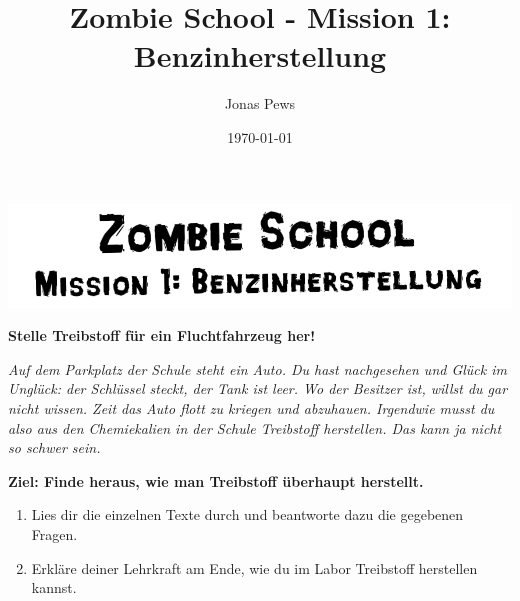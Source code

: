 \documentclass{scrartcl}  %
\author{Jonas Pews}
\title{Zombie School - Mission 1: Benzinherstellung}
\date{\today}
\begin{document}
	\begin{center}
		\includegraphics{img/headline_ch_01_raffinerie}
	\end{center}	
	
	\begin{center}
		{\LARGE \textbf{Stelle Treibstoff für ein Fluchtfahrzeug her!}}
	\end{center}
	
\vspace{0.7cm}	
	\textit{Auf dem Parkplatz der Schule steht ein Auto. Du hast nachgesehen und Glück im Unglück: der Schlüssel steckt, der Tank ist leer. Wo der Besitzer ist, willst du gar nicht wissen. Zeit das Auto flott zu kriegen und abzuhauen. Irgendwie musst du also aus den Chemiekalien in der Schule Treibstoff herstellen. Das kann ja nicht so schwer sein.} \newline

\vspace{0.7cm}	

	\textbf{Ziel: Finde heraus, wie man Treibstoff überhaupt herstellt.}
	\begin{enumerate}
		\item Lies dir die einzelnen Texte durch und beantworte dazu die gegebenen Fragen.
		\item Erkläre deiner Lehrkraft am Ende, wie du im Labor Treibstoff herstellen kannst.
	\end{enumerate}
\end{document}
